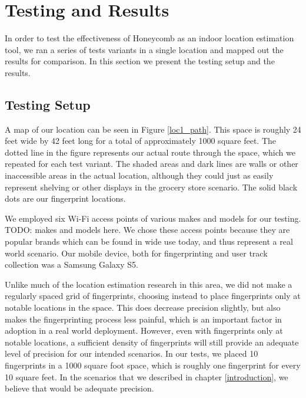 \chapter{Testing and Results}
\label{results}
%

In order to test the effectiveness of Honeycomb as an indoor location estimation tool, we ran a series of tests variants in a single location and mapped out the results for comparison. In this section we present the testing setup and the results. 


\section{Testing Setup}
%

 A map of our location can be seen in Figure \ref{loc1_path}. This space is roughly 24 feet wide by 42 feet long for a total of approximately 1000 square feet. The dotted line in the figure represents our actual route through the space, which we repeated for each test variant. The shaded areas and dark lines are walls or other inaccessible areas in the actual location, although they could just as easily represent shelving or other displays in the grocery store scenario. The solid black dots are our fingerprint locations.
 
 We employed six Wi-Fi access points of various makes and models for our testing. TODO: makes and models here. We chose these access points because they are popular brands which can be found in wide use today, and thus represent a real world scenario. Our mobile device, both for fingerprinting and user track collection was a Samsung Galaxy S5. 
 
 Unlike much of the location estimation research in this area, we did not make a regularly spaced grid of fingerprints, choosing instead to place fingerprints only at notable locations in the space. This does decrease precision slightly, but also makes the fingerprinting process less painful, which is an important factor in adoption in a real world deployment. However, even with fingerprints only at notable locations, a sufficient density of fingerprints will still provide an adequate level of precision for our intended scenarios. In our tests, we placed 10 fingerprints in a 1000 square foot space, which is roughly one fingerprint for every 10 square feet. In the scenarios that we described in chapter \ref{introduction}, we believe that would be adequate precision. 


